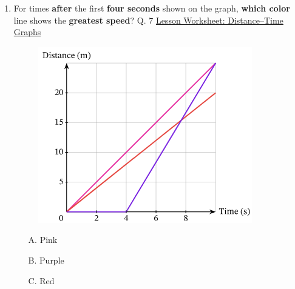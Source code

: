 \documentclass[A4,12pt]{article}
\begin{document}
\begin{enumerate}[label=\bfseries (\arabic*)]
\item For times \textbf{after} the first \textbf{four seconds} shown on the graph, \textbf{which color} line shows the \textbf{greatest speed}? \cite{Nagwa} Q. 7 \href{https://www.nagwa.com/en/worksheets/964158724874/}{Lesson Worksheet: Distance–Time Graphs}
%
\begin{figure}[H]
    \centering
    \includegraphics[scale=0.7]{Nagwa_Q7_kin.png}
    \caption{}
    \label{fig:my_label}
\end{figure}
%
\begin{multicols}{3}
\begin{itemize}
    \item[A.] Pink
    \item[B.] Purple
    \item[C.] Red
\end{itemize}
\end{multicols}















\end{enumerate}
\end{document}
